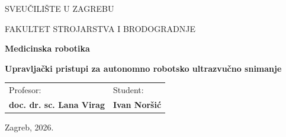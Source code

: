 \documentclass[12pt,a4paper]{article}
\newcommand{\univname}{SVEUČILIŠTE U ZAGREBU}
\newcommand{\facultyname}{FAKULTET STROJARSTVA I BRODOGRADNJE}
\newcommand{\coursename}{Medicinska robotika}
\newcommand{\seminartitle}{Upravljački pristupi za autonomno robotsko ultrazvučno snimanje}
\newcommand{\professorname}{doc. dr. sc. Lana Virag}
\newcommand{\authorname}{Ivan Noršić}
\newcommand{\locationdate}{Zagreb, 2026.}
\begin{document}
\begin{titlepage}
  \centering
  {\fontsize{14}{17}\selectfont \univname \par}
  {\fontsize{14}{17}\selectfont \facultyname \par}
  \vfill
  {\fontsize{28}{34}\bfseries \coursename \par}
  \vspace{0.8cm}
  {\fontsize{14}{18}\bfseries \seminartitle \par}
  \vfill
  \begin{tabular}{p{}>{\raggedleft\arraybackslash}p{}}
    \textmd{Profesor:} & \textmd{Student:} \\[0.3cm]
    \textbf{\professorname} & \textbf{\authorname}
  \end{tabular}
  \vspace{1.5cm}
  \par
  {\normalfont \locationdate \par}
\end{titlepage}

\setcounter{page}{1}

\tableofcontents
\clearpage



\setcounter{page}{1}










\clearpage


\end{document}
